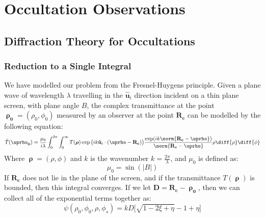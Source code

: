 \chapter{Occultation Observations}
    \section{Diffraction Theory for Occultations}
        \subsection{Reduction to a Single Integral}
            We have modelled our problem from the
            Fresnel-Huygens principle. Given a plane wave of
            wavelength $\lambda$ travelling in the
            $\mathbf{\hat{u}}_{i}$ direction incident on a thin
            plane screen, with plane angle $B$,
            the complex transmittance at the point
            $\boldsymbol{\uprho_{0}}=(\rho_{0},\phi_{0})$ measured
            by an observer at the point $\mathbf{R_{c}}$ can be
            modelled by the following equation:
            \begin{equation}
                \hat{T}(\boldsymbol{\uprho_{0}})
                =\frac{\mu_{0}}{i\lambda}
                    \int_{0}^{2\pi}\int_{0}^{\infty}
                    T(\boldsymbol{\rho})
                    \exp\big(ik\mathbf{\hat{u}}_{i}\cdot
                        (\boldsymbol{\uprho}-\mathbf{R_{c}})\big)
                    \frac{\exp(ik
                          \norm{\mathbf{R_{c}}-\boldsymbol{\uprho}})}
                         {\norm{\mathbf{R_{c}}-\boldsymbol{\uprho}}}
                    \rho\diff{\rho}\diff{\phi}
            \end{equation}
            Where $\boldsymbol{\uprho}=(\rho,\phi)$ and $k$
            is the wavenumber $k=\frac{2\pi}{\lambda}$, and
            $\mu_{0}$ is defined as:
            \begin{equation}
                \mu_{0}=\sin(|B|)
            \end{equation}
            If $\mathbf{R_{c}}$ does not lie in the plane of the
            screen, and if the transmittance
            $T(\boldsymbol{\uprho})$ is bounded, then this
            integral converges. If we let
            $\mathbf{D}=\mathbf{R_{c}}-\boldsymbol{\uprho_{0}}$,
            then we can collect all of the exponential terms
            together as:
            \begin{equation}
                \psi(\rho_{0},\phi_{0},\rho,\phi_{s})
                =kD\Big[\sqrt{1-2\xi+\eta}-1+\eta\Big]
            \end{equation}
